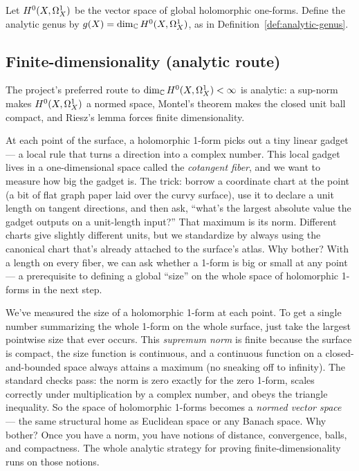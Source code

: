 Let \(H^{0}(X,\Omega^{1}_{X})\) be the vector space of global holomorphic one-forms. Define the
analytic genus by \(g(X)=\dim_{\mathbb{C}}H^{0}(X,\Omega^{1}_{X})\), as in
Definition~\ref{def:analytic-genus}.

\subsection{Finite-dimensionality (analytic route)}

The project's preferred route to \(\dim_{\mathbb{C}}H^{0}(X,\Omega^{1}_{X})<\infty\) is analytic: a
sup-norm makes \(H^{0}(X,\Omega^{1}_{X})\) a normed space, Montel's theorem makes the closed
unit ball compact, and Riesz's lemma forces finite dimensionality.



\begin{layman}
At each point of the surface, a holomorphic 1-form picks out a tiny
linear gadget --- a local rule that turns a direction into a complex number.
This local gadget lives in a one-dimensional space called the
\emph{cotangent fiber}, and we want to measure how big the gadget is.
The trick: borrow a coordinate chart at the point (a bit of flat graph
paper laid over the curvy surface), use it to declare a unit length on
tangent directions, and then ask, ``what's the largest absolute value the
gadget outputs on a unit-length input?'' That maximum is its norm.
Different charts give slightly different units, but we standardize by
always using the canonical chart that's already attached to the surface's
atlas. Why bother? With a length on every fiber, we can ask whether a
1-form is big or small at any point --- a prerequisite to defining a global
``size'' on the whole space of holomorphic 1-forms in the next step.
\end{layman}



\begin{layman}
We've measured the size of a holomorphic 1-form at each point. To get a
single number summarizing the whole 1-form on the whole surface, just
take the largest pointwise size that ever occurs. This \emph{supremum
norm} is finite because the surface is compact, the size function is
continuous, and a continuous function on a closed-and-bounded space
always attains a maximum (no sneaking off to infinity). The standard
checks pass: the norm is zero exactly for the zero 1-form, scales
correctly under multiplication by a complex number, and obeys the
triangle inequality. So the space of holomorphic 1-forms becomes a
\emph{normed vector space} --- the same structural home as Euclidean space
or any Banach space. Why bother? Once you have a norm, you have notions
of distance, convergence, balls, and compactness. The whole analytic
strategy for proving finite-dimensionality runs on those notions.
\end{layman}


